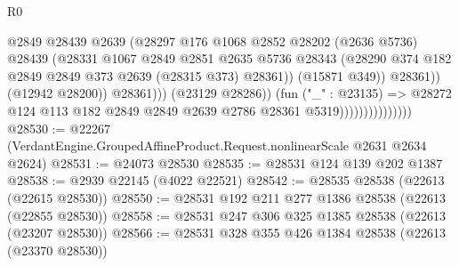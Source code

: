 \begin{lexlean}{R0}
\begin{coremodule}
                                              @2849
                                              @28439
                                              @2639
                                              (@28297
                                                @176
                                                @1068
                                                @2852
                                                @28202
                                                (@2636 @5736)
                                                @28439
                                                (@28331
                                                  @1067
                                                  @2849
                                                  @2851
                                                  @2635
                                                  @5736
                                                  @28343
                                                  (@28290
                                                    @374
                                                    @182
                                                    @2849
                                                    @2849
                                                    @373
                                                    @2639
                                                    (@28315 @373)
                                                    @28361))
                                                (@15871 @349))
                                              @28361))
                                          (@12942 @28200))
                                        @28361)))
                                  (@23129 @28286))
                                (fun ("_" : @23135) =>
                                @28272
                                  @124
                                  @113
                                  @182
                                  @2849
                                  @2849
                                  @2639
                                  @2786
                                  @28361
                                  @5319)))))))))))))))
@28530 := @22267 (VerdantEngine.GroupedAffineProduct.Request.nonlinearScale @2631 @2634 @2624)
@28531 := @24073 @28530
@28535 := @28531 @124 @139 @202 @1387
@28538 := @2939 @22145 (@4022 @22521)
@28542 := @28535 @28538 (@22613 (@22615 @28530))
@28550 := @28531 @192 @211 @277 @1386 @28538 (@22613 (@22855 @28530))
@28558 := @28531 @247 @306 @325 @1385 @28538 (@22613 (@23207 @28530))
@28566 := @28531 @328 @355 @426 @1384 @28538 (@22613 (@23370 @28530))

\end{coremodule}
\end{lexlean}
